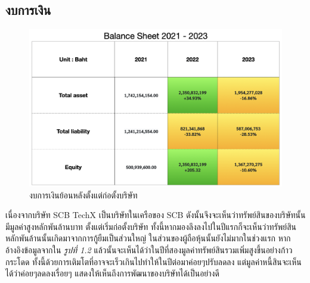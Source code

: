 \subsection{งบการเงิน}
\begin{figure}[ht]
    \begin{center}
        \includegraphics[scale=0.4]{images/balance.png}
    \end{center}
    \caption[งบการเงินย้อนหลังตั้งแต่ก่อตั้งบริษัท]{งบการเงินย้อนหลังตั้งแต่ก่อตั้งบริษัท}
\end{figure}
เนื่องจากบริษัท SCB TechX เป็นบริษัทในเครือของ SCB ดังนั้นจึงจะเห็นว่าทรัพย์สินของบริษัทนั้นมีมูลค่าสูงหลักพันล้านบาท ตั้งแต่เริ่มก่อตั้งบริษัท ทั้งนี้หากมองลึงลงไปในปีแรกก็จะเห็นว่าทรัพย์สินหลักพันล้านนั้นเกิดมาจากการกู้ยืมเป็นส่วนใหญ่ ในส่วนของผู้ถือหุ้นนั้นยังไม่มากในช่วงแรก หากอ้างอิงข้อมูลจากใน \textit{รูปที่ 1.2 }แล้วนั้นจะเห็นได้ว่าในปีที่สองมูลค่าทรัพย์สินรวมเพิ่มสูงขึ้นอย่างก้าวกระโดด ทั้งนี้ด้วยการเติมโตที่อาจจะเร็วเกินไปทำให้ในปีต่อมาค่อยๆปรับลดลง  แต่มูลค่าหนี้สินจะเห็นได้ว่าค่อยๆลดลงเรื่อยๆ แสดงให้เห็นถึงการพัฒนาของบริษัทได้เป็นอย่างดี

\clearpage

